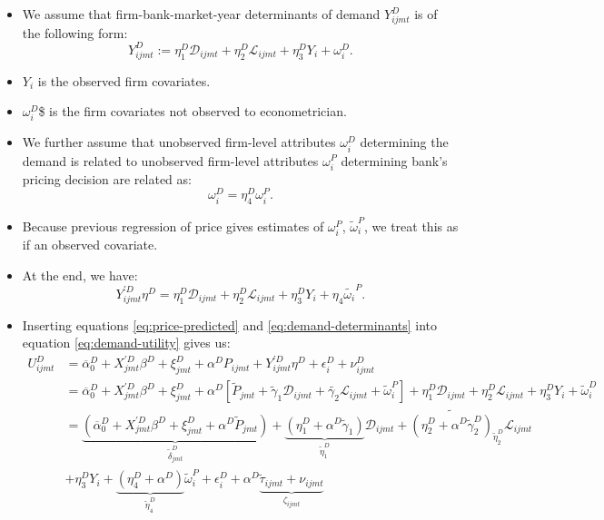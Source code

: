 \documentclass[
]{book}
\providecommand{\tightlist}{%
  \setlength{\itemsep}{0pt}\setlength{\parskip}{0pt}}
\begin{document}
\begin{itemize}
\tightlist
\item
  We assume that firm-bank-market-year determinants of demand \(Y_{ijmt}^D\) is of the following form:
  \[
  Y_{ijmt}^D := \eta_1^D \mathcal{D}_{ijmt} + \eta_2^D \mathcal{L}_{ijmt} + \eta_3^D Y_i + \omega_i^D. 
  \]
\item
  \(Y_i\) is the observed firm covariates.
\item
  \(\omega_i^D\)\$ is the firm covariates not observed to econometrician.
\item
  We further assume that unobserved firm-level attributes \(\omega_i^D\) determining the demand is related to unobserved firm-level attributes \(\omega_i^P\) determining bank's pricing decision are related as:
  \[
  \omega_i^D = \eta_4^D \omega_i^P.
  \]
\item
  Because previous regression of price gives estimates of \(\omega_i^P\), \(\tilde{\omega}_i^P\), we treat this as if an observed covariate.
\item
  At the end, we have:
  \begin{equation}
  Y_{ijmt}^{\prime D} \eta^D = \eta_1^D \mathcal{D}_{ijmt} + \eta_2^D \mathcal{L}_{ijmt} + \eta_3^D Y_i + \eta_4 \tilde{\omega_i}^P. \label{eq:demand-determinants}
  \end{equation}
\item
  Inserting equations \eqref{eq:price-predicted} and \eqref{eq:demand-determinants} into equation \eqref{eq:demand-utility} gives us:
  \begin{equation}
  \begin{split}
  U_{ijmt}^D &= \overline{\alpha}_0^D + X_{jmt}^{\prime D} \beta^D + \xi_{jmt}^D + \alpha^D P_{ijmt} + Y_{ijmt}^{\prime D} \eta^D + \epsilon_i^D + \nu_{ijmt}^D\\
  &= \overline{\alpha}_0^D + X_{jmt}^{\prime D} \beta^D + \xi_{jmt}^D + \alpha^D[\tilde{P}_{jmt} + \tilde{\gamma}_1 \mathcal{D}_{ijmt} + \tilde{\gamma_2} \mathcal{L}_{ijmt} + \tilde{\omega}_i^P] + \eta_1^D \mathcal{D}_{ijmt} + \eta_2^D \mathcal{L}_{ijmt} + \eta_3^D Y_i + \tilde{\omega}_i^D\\
  &= \underbrace{(\overline{\alpha}_0^D + X_{jmt}^{\prime D} \beta^D + \xi_{jmt}^D + \alpha^D \tilde{P}_{jmt})}_{\tilde{\delta}_{jmt}^D} + \underbrace{(\eta_1^D + \alpha^D \tilde{\gamma}_1)}_{\tilde{\eta}_1^D}\mathcal{D}_{ijmt} + \tilde{(\eta_2^D + \alpha^D \tilde{\gamma}_2^D)}_{\tilde{\eta}_2^D} \mathcal{L}_{ijmt}\\
  &+ \eta_3^D Y_i + \underbrace{(\eta_4^D + \alpha^D)}_{\tilde{\eta}_4^D} \tilde{\omega}_i^P + \epsilon_i^D + \alpha^D \underbrace{\tilde{\tau}_{ijmt} + \nu_{ijmt}}_{\zeta_{ijmt}}\\

\end{split}
\end{equation}
\end{itemize}
\end{document}
